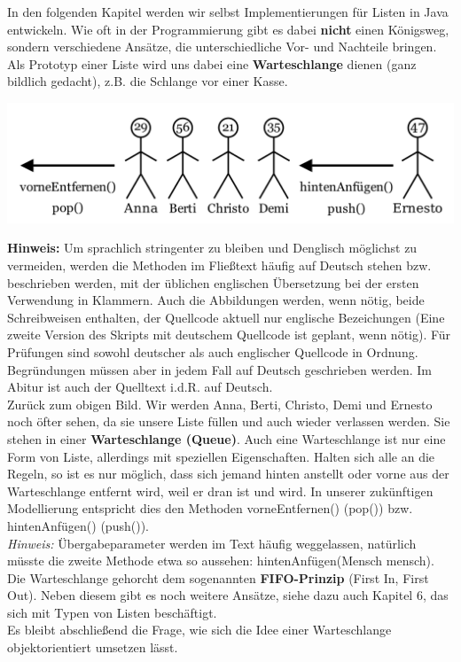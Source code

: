 \documentclass{article}
\begin{document}
In den folgenden Kapitel werden wir selbst Implementierungen für Listen in Java entwickeln. 
Wie oft in der Programmierung gibt es dabei \textbf{nicht} einen Königsweg, sondern
verschiedene Ansätze, die unterschiedliche Vor- und Nachteile bringen. \\
Als Prototyp einer Liste wird uns dabei eine \textbf{Warteschlange} dienen (ganz bildlich gedacht), z.B. die Schlange vor einer Kasse.
\begin{center}
    \includegraphics[scale=0.30]{../../media/queue.png}
\end{center}
\textbf{Hinweis:} Um sprachlich stringenter zu bleiben und Denglisch möglichst zu vermeiden, werden die Methoden im Fließtext häufig auf Deutsch stehen bzw. beschrieben werden, mit der üblichen englischen Übersetzung bei der ersten Verwendung in Klammern. Auch die Abbildungen werden, wenn nötig, beide Schreibweisen enthalten, der Quellcode aktuell nur englische Bezeichungen (Eine zweite Version des Skripts mit deutschem Quellcode ist geplant, wenn nötig). Für Prüfungen sind sowohl deutscher als auch englischer Quellcode in Ordnung.
Begründungen müssen aber in jedem Fall auf Deutsch geschrieben werden. Im Abitur ist auch der Quelltext i.d.R. auf Deutsch. \\
Zurück zum obigen Bild. Wir werden Anna, Berti, Christo, Demi und Ernesto noch öfter sehen, da sie unsere Liste füllen und auch wieder verlassen werden. 
Sie stehen in einer \textbf{Warteschlange (Queue)}. Auch eine Warteschlange ist nur eine Form von Liste, allerdings mit speziellen Eigenschaften.
Halten sich alle an die Regeln, so ist es nur möglich, dass sich jemand hinten anstellt oder vorne aus der Warteschlange entfernt wird, weil er dran ist und  wird. In unserer zukünftigen Modellierung entspricht dies den Methoden vorneEntfernen() (pop()) bzw. hintenAnfügen() (push()). \\
\textit{Hinweis:} Übergabeparameter werden im Text häufig weggelassen, natürlich müsste die zweite Methode etwa so aussehen: hintenAnfügen(Mensch mensch).
Die Warteschlange gehorcht dem sogenannten \textbf{FIFO-Prinzip} (First In, First Out). Neben diesem gibt es noch weitere Ansätze, siehe dazu auch Kapitel 6, das sich mit Typen von Listen beschäftigt. \\
Es bleibt abschließend die Frage, wie sich die Idee einer Warteschlange objektorientiert umsetzen lässt.
\newpage
\end{document}
